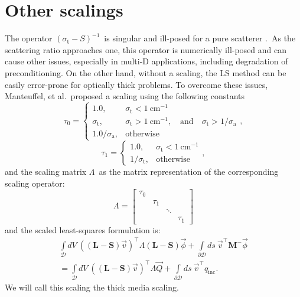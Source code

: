 \documentclass[review]{elsarticle}
\newcommand{\st}{\sigma_\mathrm{t}}
\newcommand{\pd}{{\partial\mathcal{D}}}
\newcommand{\intli}[1]{\int\limits_{{#1}}}
\newcommand{\siga}{\sigma_\mathrm{a}}
\newcommand{\intd}{\int\limits_\mathcal{D}dV\ }
\newcommand{\bs}{\mathbf{S}}
\newcommand{\bl}{\mathbf{L}}
\newcommand{\bmm}{\mathbf{M}^-}
\newcommand{\vq}{\vec{Q}}
\newcommand{\vphi}{\vec{\phi}}
\newcommand{\vt}{\vec{v}}
\newcommand{\qin}{q_\mathrm{inc}}
\begin{document}
\section{Other scalings}\label{s:scaling}
The operator $(\st-S)^{-1}$\ is singular and ill-posed for a pure scatterer \cite{morel_saaf}.\ As the scattering ratio approaches one, this operator is numerically ill-posed and can cause other issues,  especially in multi-D applications, including degradation of preconditioning\cite{clifmc}. On the other hand, without a scaling, the LS method can be easily error-prone for optically thick problems\cite{manteuffel_lspn_scaling,manteuffel_boundary}. To overcome these issues, Manteuffel, et al.\ proposed a scaling using the following constants
\begin{equation}
\tau_0=\begin{cases}
1.0,&\st<1\ \mathrm{cm}^{-1}\\
\st,&\st>1\ \mathrm{cm}^{-1}, \quad \text{and} \quad \st>1/\siga\\
1.0/\siga,&\mathrm{otherwise}
\end{cases},
\end{equation}
\begin{equation}
\tau_1=\begin{cases}
1.0,&\st<1\ \mathrm{cm}^{-1}\\
1/\st,&\mathrm{otherwise}
\end{cases},
\end{equation}
and the scaling matrix $\Lambda$\ as the matrix representation of the corresponding scaling operator\cite{ressel_dissertation}:
\begin{equation}
\Lambda=
\begin{bmatrix}
\tau_0& & &\\
&\tau_1&&\\
&&\ddots&\\
&&&\tau_1
\end{bmatrix}
\end{equation}
and the scaled least-squares formulation is:
\begin{align}
\intd\left((\bl-\bs)\vec{v}\right)^\top\Lambda(\bl-\bs)\vec{\phi}+\intli{\pd}ds\ \vt^\top\bmm\vphi\nonumber\\
=\intd\left((\bl-\bs)\vec{v}\right)^\top\Lambda\vq+\intli{\pd}ds\ \vt^\top\qin.
\end{align}
We will call this scaling the thick media scaling.
\end{document}
